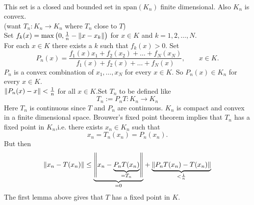 \begin{description}
\begin{beweis}
\begin{align*}
		\end{align*}
		This set is a closed and bounded set in $\text{span}(K_n)$ finite dimensional. Also $K_n$ is convex.  \\
		(want $T_n: K_n \to K_n$ where $T_n$ close to $T$) \\
		Set $f_k(x)= \max \left(0, \frac{1}{n}- \norm{x-x_k}\right)$ for $x \in K$ and $k=1,2, \dots,N$. \\
		For each $x \in K$ there exists a $k$ such that $f_k(x)>0$. Set
		\[
			P_n(x) = \frac{f_1(x)x_1+f_2(x_2)+ \dots+ f_N(x_N)}{f_1(x)+f_2(x)+ \dots+ f_N(x)}, \qquad x \in K.
		\]
		$P_n$ is a convex combination of $x_1,\dots,x_N$ for every $x \in K$. So $P_n(x) \in K_n$ for every $x \in K$. \\
		$\norm{P_n(x)-x} < \frac{1}{n}$ for all $x \in K$.Set $T_n$ to be defined like
		\[
			T_n := P_n T : K_n \to K_n
		\]
		Here $T_n$ is continuous since $T$ and $P_n$ are continuous. $K_n$ is compact and convex in a finite dimensional space. Brouwer's fixed point theorem implies that $T_n$ has a fixed point in $K_n$,i.e. there exists $x_n \in K_n$ such that
		\[
			x_n = T_n(x_n)= P_n(x_n).
		\]
		But then
		\[
			\norm{x_n - T(x_n)} \leq  \underset{=0}{\underbrace{\norm{x_n - \underset{=T_n}{\underbrace{P_nT(x_n)}}}}} + \underset{< \frac{1}{n}}{\underbrace{\norm{ P_nT(x_n)- T(x_n)}}}
		\]
		The first lemma above gives that $T$ has a fixed point in $K$.
	\end{beweis} 
\end{description}
